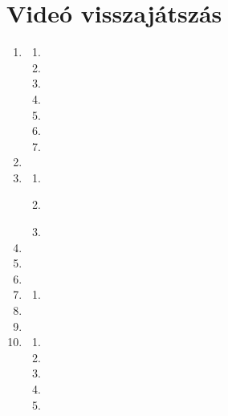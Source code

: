 \documentclass[]{report}
\providecommand{\tightlist}{%
  \setlength{\itemsep}{0pt}\setlength{\parskip}{0pt}}
\renewcommand{\labelenumii}{\arabic{enumi}.\arabic{enumii}}
\begin{document}
\chapter{Videó visszajátszás}

\begin{enumerate}
\item

    \begin{enumerate}
    \def\labelenumii{\roman{enumii})}
    \tightlist
    \item
    
    \item
    
    \item
    
    \item
    
    \item
    
    \item
    
    \item
    
    \end{enumerate}
\item

\item

    \begin{enumerate}
    \item
    
    \item \label{VR:CR}
    
    \item
    
    \end{enumerate}
\item

\item

\item

\item

    \begin{enumerate}
    \item
    
    \end{enumerate}
\item

\item

\item

    \begin{enumerate}
    \item
    
    \item
    
    \item
    
    \item
    
    \item
    
        \begin{enumerate}

\end{enumerate}
\end{enumerate}
\end{enumerate}
\end{document}
